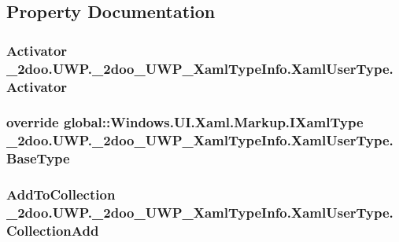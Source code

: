 \subsection{Property Documentation}
\hypertarget{class__2doo_1_1_u_w_p_1_1__2doo___u_w_p___xaml_type_info_1_1_xaml_user_type_aec8bf9d82d32de8ec3a338ac1a4d641}{
\subsubsection[{Activator}]{\setlength{\rightskip}{0pt plus 5cm}Activator \_\-2doo.UWP.\_\-2doo\_\-UWP\_\-XamlTypeInfo.XamlUserType.Activator}}
\label{class__2doo_1_1_u_w_p_1_1__2doo___u_w_p___xaml_type_info_1_1_xaml_user_type_aec8bf9d82d32de8ec3a338ac1a4d641}


\hypertarget{class__2doo_1_1_u_w_p_1_1__2doo___u_w_p___xaml_type_info_1_1_xaml_user_type_6b5fe02f4981ca4745e58a6da1713c10}{
\subsubsection[{BaseType}]{\setlength{\rightskip}{0pt plus 5cm}override global::Windows.UI.Xaml.Markup.IXamlType \_\-2doo.UWP.\_\-2doo\_\-UWP\_\-XamlTypeInfo.XamlUserType.BaseType}}
\label{class__2doo_1_1_u_w_p_1_1__2doo___u_w_p___xaml_type_info_1_1_xaml_user_type_6b5fe02f4981ca4745e58a6da1713c10}


\hypertarget{class__2doo_1_1_u_w_p_1_1__2doo___u_w_p___xaml_type_info_1_1_xaml_user_type_59a717ad24efc37521ee5641ce8bcd83}{
\subsubsection[{CollectionAdd}]{\setlength{\rightskip}{0pt plus 5cm}AddToCollection \_\-2doo.UWP.\_\-2doo\_\-UWP\_\-XamlTypeInfo.XamlUserType.CollectionAdd}}
\label{class__2doo_1_1_u_w_p_1_1__2doo___u_w_p___xaml_type_info_1_1_xaml_user_type_59a717ad24efc37521ee5641ce8bcd83}


